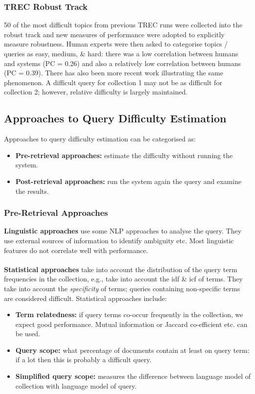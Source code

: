 \documentclass[a4paper,11pt]{article}
\begin{document}
\subsubsection{TREC Robust Track}
50 of the most difficult topics from previous TREC runs were collected into the robust track and new measures of performance were adopted to explicitly measure robustness.
Human experts were then asked to categorise topics / queries as easy, medium, \& hard:
there was a low correlation between humans and systems (PC = 0.26) and also a relatively low correlation between humans (PC = 0.39).
There has also been more recent work illustrating the same phenomenon.
A difficult query for collection 1 may not be as difficult for collection 2; however, relative difficulty is largely maintained.

\subsection{Approaches to Query Difficulty Estimation}
Approaches to query difficulty estimation can be categorised as:
\begin{itemize}
    \item   \textbf{Pre-retrieval approaches:} estimate the difficulty without running the system.
    \item   \textbf{Post-retrieval approaches:} run the system again the query and examine the results.
\end{itemize}

\subsubsection{Pre-Retrieval Approaches}
\textbf{Linguistic approaches} use some NLP approaches to analyse the query.
They use external sources of information to identify ambiguity etc.
Most linguistic features do not correlate well with performance.
\\\\
\textbf{Statistical approaches} take into account the distribution of the query term frequencies in the collection, e.g., take into account the idf \& icf of terms.
They take into account the \textit{specificity} of terms;
queries containing non-specific terms are considered difficult.
Statistical approaches include:
\begin{itemize}
    \item   \textbf{Term relatedness:} if query terms co-occur frequently in the collection, we expect good performance.
            Mutual information or Jaccard co-efficient etc. can be used.
    \item   \textbf{Query scope:} what percentage of documents contain at least on query term: if a lot then this is probably a difficult query.
    \item   \textbf{Simplified query scope:} measures the difference between language model of collection with language model of query.
\end{itemize}
\end{document}
